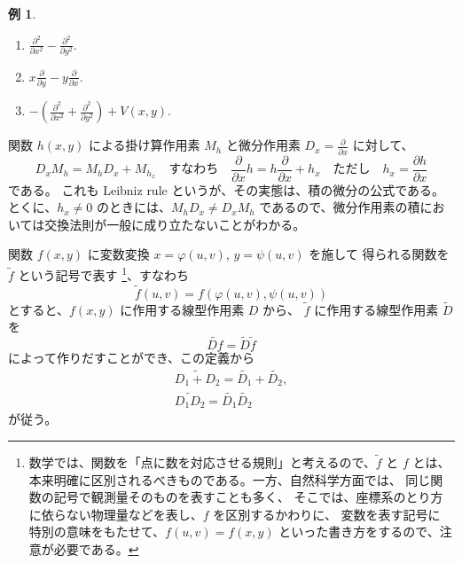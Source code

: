 \documentclass[a4paper]{jsarticle}
\theoremstyle{definition}
\newtheorem{Example}[Theorem]{例}
\theoremstyle{remark}
\newcommand{\del}{\partial}
\begin{document}
\begin{Example}~
  \begin{enumerate}
  \item $\displaystyle \frac{\del^2}{\del x^2} - 
\frac{\del^2}{\del y^2}$. 
\item 
$\displaystyle 
x\frac{\del}{\del y} - y\frac{\del}{\del x}$. 
\item 
$\displaystyle 
-\left( 
\frac{\del^2}{\del x^2} + \frac{\del^2}{\del y^2}\right) 
+ V(x,y)$.
  \end{enumerate}
\end{Example}

関数 $h(x,y)$ による掛け算作用素 $M_h$ と微分作用素 $D_x = \frac{\partial}{\partial x}$ に対して、
\[
D_x M_h = M_h D_x + M_{h_x}
\quad
\text{すなわち}
\quad 
\frac{\partial}{\partial x} h = h \frac{\partial}{\partial x} + h_x
\quad
\text{ただし}
\quad
h_x = \frac{\partial h}{\partial x}
\]
である。
これも Leibniz rule というが、その実態は、積の微分の公式である。とくに、$h_x \not= 0$ 
のときには、$M_h D_x \not= D_x M_h$ であるので、微分作用素の積においては交換法則が一般に成り立たないことがわかる。

関数 $f(x,y)$ に変数変換 $x = \varphi(u,v)$, $y = \psi(u,v)$ を施して
得られる関数を $\widetilde f$ という記号で表す
\footnote{数学では、関数を「点に数を対応させる規則」と考えるので、$\widetilde f$ と $f$ とは、
本来明確に区別されるべきものである。一方、自然科学方面では、
同じ関数の記号で観測量そのものを表すことも多く、
そこでは、座標系のとり方に依らない物理量などを表し、$f$ を区別するかわりに、
変数を表す記号に
特別の意味をもたせて、$f(u,v) = f(x,y)$ といった書き方をするので、注意が必要である。}、すなわち
\[
\widetilde f(u,v) = f(\varphi(u,v),\psi(u,v))
\]
とすると、$f(x,y)$ に作用する線型作用素 $D$ から、
$\widetilde f$ に作用する線型作用素 $\widetilde D$ を
\[
\widetilde{Df} = \widetilde D \widetilde f
\]
によって作りだすことができ、この定義から
\begin{gather*}
\widetilde{D_1 + D_2} = \widetilde{D_1} + \widetilde{D_2}, \\
\widetilde{D_1D_2} = \widetilde{D_1} \widetilde{D_2}
\end{gather*}
が従う。
\end{document}
